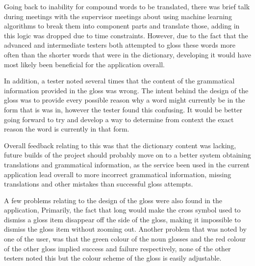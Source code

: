 Going back to inability for compound words to be translated, there was brief talk during meetings with the supervisor meetings about using machine learning algorithms to break them into component parts and translate those, adding in this logic was dropped due to time constraints. However, due to the fact that the advanced and intermediate testers both attempted to gloss these words more often than the shorter words that were in the dictionary, developing it would have most likely been beneficial for the application overall. 

In addition, a tester noted several times that the content of the grammatical information provided in the gloss was wrong. The intent behind the design of the gloss was to provide every possible reason why a word might currently be in the form that is was in, however the tester found this confusing. It would be better going forward to try and develop a way to determine from context the exact reason the word is currently in that form. 

Overall feedback relating to this was that the dictionary content was lacking, future builds of the project should probably move on to a better system obtaining translations and grammatical information, as the service been used in the current application lead overall to more incorrect grammatical information, missing translations and other mistakes than successful gloss attempts.

A few problems relating to the design of the gloss were also found in the application, Primarily, the fact that long would make the cross symbol used to dismiss a gloss item disappear off the side of the gloss, making it impossible to dismiss the gloss item without zooming out. Another problem that was noted by one of the user, was that the green colour of the noun glosses and the red colour of the other gloss implied success and failure respectively, none of the other testers noted this but the colour scheme of the gloss is easily adjustable.


